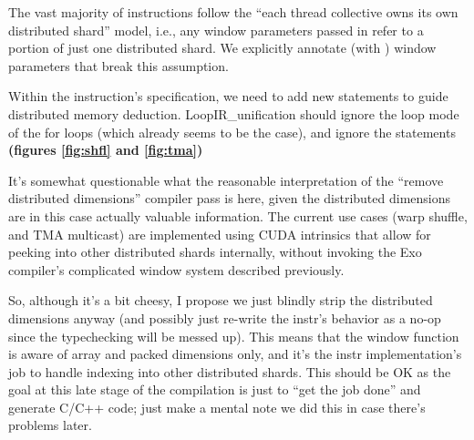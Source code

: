 \newpage
{}
\label{ch:Instrs}

The vast majority of instructions follow the ``each thread collective owns its own distributed shard'' model, i.e., any window parameters passed in refer to a portion of just one distributed shard.
We explicitly annotate (with ) window parameters that break this assumption.

\filbreak
Within the instruction's  specification, we need to add new  statements to guide distributed memory deduction.
LoopIR\_unification should ignore the loop mode of the for loops (which already seems to be the case), and ignore the  statements \textbf{(figures \ref{fig:shfl} and \ref{fig:tma})}

\begin{figure*}[!b]

\caption{Warp Shuffle Instr} \label{fig:shfl}
\end{figure*}

\filbreak
It's somewhat questionable what the reasonable interpretation of the ``remove distributed dimensions'' compiler pass is here, given the distributed dimensions are in this case actually valuable information.
The current use cases (warp shuffle, and TMA multicast) are implemented using CUDA intrinsics that allow for peeking into other distributed shards internally, without invoking the Exo compiler's complicated window system described previously.

\filbreak
So, although it's a bit cheesy, I propose we just blindly strip the distributed dimensions anyway (and possibly just re-write the instr's behavior as a no-op since the typechecking will be messed up).
This means that the window  function is aware of array and packed dimensions only, and it's the instr implementation's job to handle indexing into other distributed shards.
This should be OK as the goal at this late stage of the compilation is just to ``get the job done'' and generate C/C++ code;
just make a mental note we did this in case there's problems later.

\begin{figure*}[!b]

\caption{TMA Multicast Instr} \label{fig:tma}
\end{figure*}

\newpage
{}
\label{ch:Timelines}

